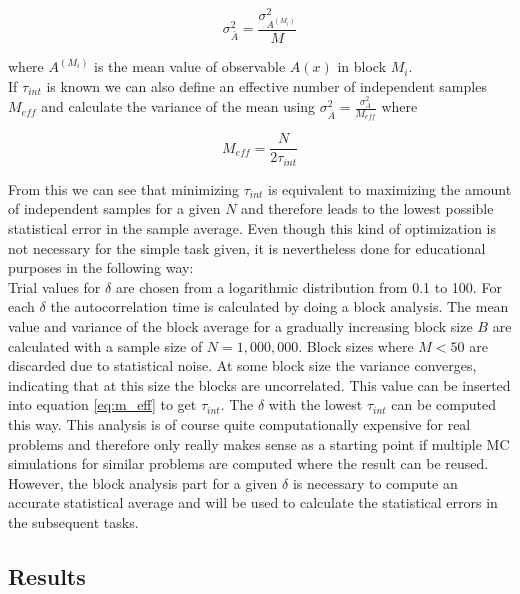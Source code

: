 \documentclass[a4paper, 11pt]{article}          %
\begin{document}
    \begin{equation*}
        \sigma_{\bar{A}}^2 = \frac{\sigma_{A^{(M_i)}}^2}{M}
    \end{equation*}

    where $A^{(M_i)}$ is the mean value of observable $A(x)$ in block $M_i$. \\

    If $\tau_{int}$ is known we can also define an effective number of independent samples $M_{eff}$ and calculate the variance of the mean using $\sigma_{\overline{A}}^2 = \frac{\sigma_A^2}{M_{eff}}$ where

    \begin{equation}
        \label{eq:m_eff}
        M_{eff} = \frac{N}{2\tau_{int}}
    \end{equation}

    From this we can see that minimizing $\tau_{int}$ is equivalent to maximizing the amount of independent samples for a given $N$ and therefore leads to the lowest possible statistical error in the sample average. Even though this kind of optimization is not necessary for the simple task given, it is nevertheless done for educational purposes in the following way: \\

    Trial values for $\delta$ are chosen from a logarithmic distribution from 0.1 to 100. For each $\delta$ the autocorrelation time is calculated by doing a block analysis. The mean value and variance of the block average for a gradually increasing block size $B$ are calculated with a sample size of $N=1,000,000$. Block sizes where $M<50$ are discarded due to statistical noise. At some block size the variance converges, indicating that at this size the blocks are uncorrelated. This value can be inserted into equation \eqref{eq:m_eff} to get $\tau_{int}$. The $\delta$ with the lowest $\tau_{int}$ can be computed this way. This analysis is of course quite computationally expensive for real problems and therefore only really makes sense as a starting point if multiple MC simulations for similar problems are computed where the result can be reused. However, the block analysis part for a given $\delta$ is necessary to compute an accurate statistical average and will be used to calculate the statistical errors in the subsequent tasks.

    \subsection{Results}
\end{document}
